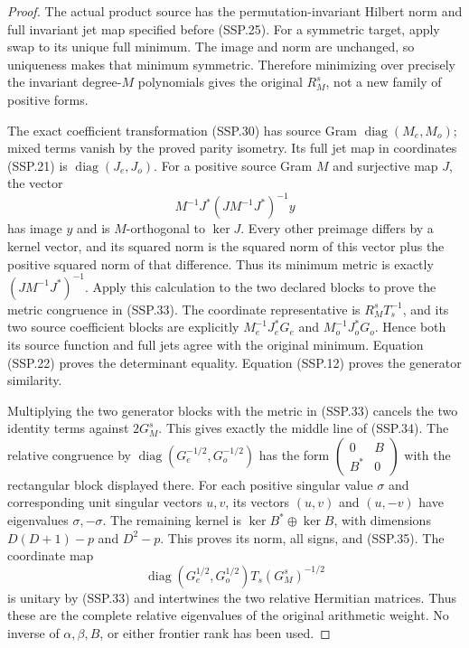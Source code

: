 \begin{proof}
The actual product source has the permutation-invariant Hilbert
norm and full invariant jet map specified before (SSP.25).
For a symmetric target, apply swap to its unique full minimum.
The image and norm are unchanged, so uniqueness makes that
minimum symmetric.  Therefore minimizing over precisely the
invariant degree-\(M\) polynomials gives the original
\(R_M^s\), not a new family of positive forms.

The exact coefficient transformation (SSP.30) has source Gram
\(\operatorname{diag}(M_e,M_o)\); mixed terms vanish by the
proved parity isometry.  Its full jet map in coordinates
(SSP.21) is \(\operatorname{diag}(J_e,J_o)\).
For a positive source Gram \(M\) and surjective map \(J\),
the vector
\[
 M^{-1}J^*(JM^{-1}J^*)^{-1}y
\]
has image \(y\) and is \(M\)-orthogonal to \(\ker J\).
Every other preimage differs by a kernel vector, and its
squared norm is the squared norm of this vector plus the
positive squared norm of that difference.  Thus its minimum
metric is exactly \((JM^{-1}J^*)^{-1}\).
Apply this calculation to the two declared blocks to prove
the metric congruence in (SSP.33).  The coordinate representative
is \(R_M^sT_s^{-1}\), and its two source coefficient blocks
are explicitly \(M_e^{-1}J_e^*G_e\) and
\(M_o^{-1}J_o^*G_o\).  Hence both its source function and
full jets agree with the original minimum.
Equation (SSP.22) proves the determinant equality.
Equation (SSP.12) proves the generator similarity.

Multiplying the two generator blocks with the metric in
(SSP.33) cancels the two identity terms against \(2G_M^s\).
This gives exactly the middle line of (SSP.34).
The relative congruence by
\(\operatorname{diag}(G_e^{-1/2},G_o^{-1/2})\) has the form
\(\left(\begin{smallmatrix}0&B\\B^*&0\end{smallmatrix}\right)\)
with the rectangular block displayed there.
For each positive singular value \(\sigma\) and corresponding
unit singular vectors \(u,v\), its vectors \((u,v)\) and
\((u,-v)\) have eigenvalues \(\sigma,-\sigma\).
The remaining kernel is \(\ker B^*\oplus\ker B\),
with dimensions \(D(D+1)-p\) and \(D^2-p\).
This proves its norm, all signs, and (SSP.35).
The coordinate map
\[
 \operatorname{diag}(G_e^{1/2},G_o^{1/2})
             T_s(G_M^s)^{-1/2}
\]
is unitary by (SSP.33) and intertwines the two relative
Hermitian matrices.  Thus these are the complete relative
eigenvalues of the original arithmetic weight.
No inverse of \(\alpha,\beta,B\), or either frontier rank
has been used.
\end{proof}

